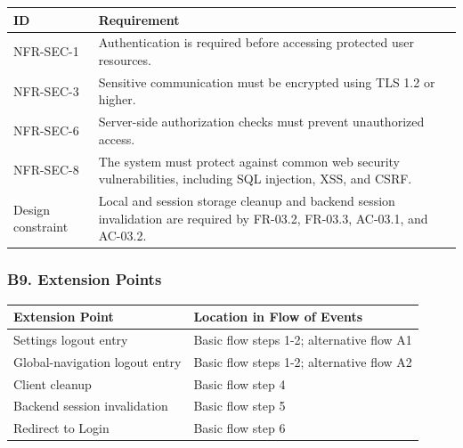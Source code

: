 \documentclass[12pt]{article}
\renewcommand{\baselinestretch}{1.5}
\begin{document}
\begingroup
\small
\renewcommand{\baselinestretch}{1.0}\selectfont
\renewcommand{\arraystretch}{1.15}
\setlength{\tabcolsep}{6pt}
\begin{longtable}{|>{\raggedright\arraybackslash}p{}|>{\raggedright\arraybackslash}p{}|}
\hline
\textbf{ID} & \textbf{Requirement} \\ \hline
\endhead
NFR-SEC-1 & Authentication is required before accessing protected user resources. \\ \hline
NFR-SEC-3 & Sensitive communication must be encrypted using TLS 1.2 or higher. \\ \hline
NFR-SEC-6 & Server-side authorization checks must prevent unauthorized access. \\ \hline
NFR-SEC-8 & The system must protect against common web security vulnerabilities, including SQL injection, XSS, and CSRF. \\ \hline
Design constraint & Local and session storage cleanup and backend session invalidation are required by FR-03.2, FR-03.3, AC-03.1, and AC-03.2. \\ \hline
\end{longtable}
\endgroup
\par\medskip

\hypertarget{sec:b9-extension-points}{}
\subsubsection*{B9. Extension Points}
\par\medskip

\begingroup
\small
\renewcommand{\baselinestretch}{1.0}\selectfont
\renewcommand{\arraystretch}{1.15}
\setlength{\tabcolsep}{6pt}
\begin{longtable}{|>{\raggedright\arraybackslash}p{}|>{\raggedright\arraybackslash}p{}|}
\hline
\textbf{Extension Point} & \textbf{Location in Flow of Events} \\ \hline
\endhead
Settings logout entry & Basic flow steps 1-2; alternative flow A1 \\ \hline
Global-navigation logout entry & Basic flow steps 1-2; alternative flow A2 \\ \hline
Client cleanup & Basic flow step 4 \\ \hline
Backend session invalidation & Basic flow step 5 \\ \hline
Redirect to Login & Basic flow step 6 \\ \hline
\end{longtable}
\endgroup
\par\medskip
\end{document}
